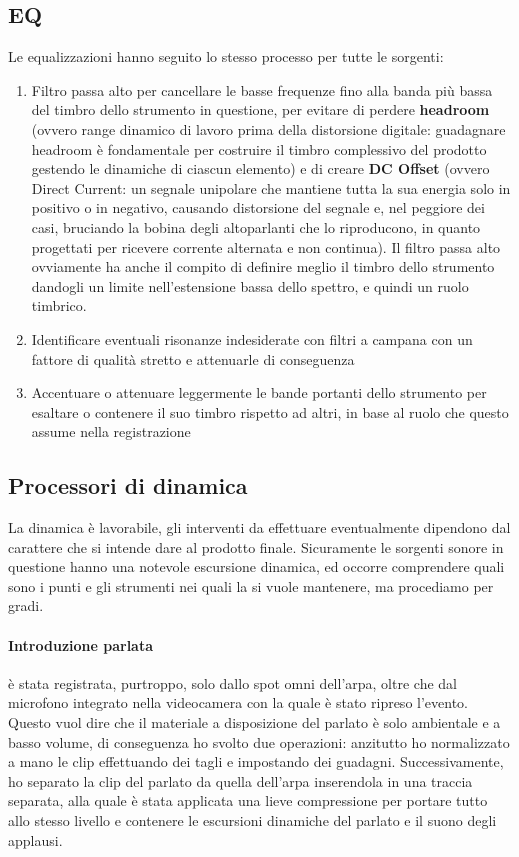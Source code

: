 	\subsection{EQ}
	Le equalizzazioni hanno seguito lo stesso processo per tutte le sorgenti:
		\begin{enumerate}
			\item Filtro passa alto per cancellare le basse frequenze fino alla banda più bassa del timbro dello strumento in questione, per evitare di perdere \textbf{headroom} (ovvero range dinamico di lavoro prima della distorsione digitale: guadagnare headroom è fondamentale per costruire il timbro complessivo del prodotto gestendo le dinamiche di ciascun elemento) e di creare \textbf{DC Offset} (ovvero Direct Current: un segnale unipolare che mantiene tutta la sua energia solo in positivo o in negativo, causando distorsione del segnale e, nel peggiore dei casi, bruciando la bobina degli altoparlanti che lo riproducono, in quanto progettati per ricevere corrente alternata e non continua). Il filtro passa alto ovviamente ha anche il compito di definire meglio il timbro dello strumento dandogli un limite nell'estensione bassa dello spettro, e quindi un ruolo timbrico.
			\item Identificare eventuali risonanze indesiderate con filtri a campana con un fattore di qualità stretto e attenuarle di conseguenza
			\item Accentuare o attenuare leggermente le bande portanti dello strumento per esaltare o contenere il suo timbro rispetto ad altri, in base al ruolo che questo assume nella registrazione
		\end{enumerate}
	
	\subsection{Processori di dinamica}
	La dinamica è lavorabile, gli interventi da effettuare eventualmente dipendono dal carattere che si intende dare al prodotto finale. Sicuramente le sorgenti sonore in questione hanno una notevole escursione dinamica, ed occorre comprendere quali sono i punti e gli strumenti nei quali la si vuole mantenere, ma procediamo per gradi.
	
		\paragraph{Introduzione parlata} è stata registrata, purtroppo, solo dallo spot omni dell'arpa, oltre che dal microfono integrato nella videocamera con la quale è stato ripreso l'evento. Questo vuol dire che il materiale a disposizione del parlato è solo ambientale e a basso volume, di conseguenza ho svolto due operazioni: anzitutto ho normalizzato a mano le clip effettuando dei tagli e impostando dei guadagni. Successivamente, ho separato la clip del parlato da quella dell'arpa inserendola in una traccia separata, alla quale è stata applicata una lieve compressione per portare tutto allo stesso livello e contenere le escursioni dinamiche del parlato e il suono degli applausi.
		
